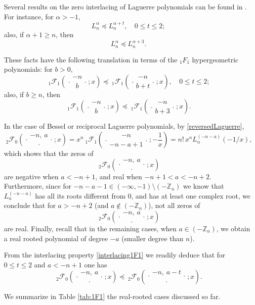 \documentclass[reqno,11pt]{amsart}
\theoremstyle{remark}
\newcommand{\zz}{\mathbb{Z}}
\newcommand*\pFq[5]{%
 {\ }_{#1}{\mathcal F}_{#2}{\left(\genfrac..{0pt}{}{#3}{#4};#5\right)}%
}
\begin{document}
Several results on the zero interlacing of Laguerre polynomials can be found in \cite{arvesu2021interlacing, driver2016interlacing, driver2019sharp}. For instance, for  $\alpha>-1$, 
$$ 
L_n^{\alpha}\preccurlyeq L_n^{\alpha+t}, \quad %
0 \leq t\leq 2;
$$
also, if $\alpha+1\geq n$, then  
$$ 
L_n^{\alpha}\preccurlyeq L_n^{\alpha+3}.
$$

These facts have the following translation in terms of the ${}_1 F_1$ hypergeometric polynomials: for $b >0$,
\begin{equation}
    \label{interlacing1F1}
     \pFq{1}{1}{-n}{b}{x}\preccurlyeq \pFq{1}{1}{-n}{b+t}{x}, \quad 0\leq t\leq 2;
\end{equation}
also, if $b \geq n$, then
\begin{equation}
    \label{interlacing1F1bis}
    \pFq{1}{1}{-n}{b}{x}\preccurlyeq \pFq{1}{1}{-n}{b+3}{x}.
\end{equation}
 
\medskip

In the case of Bessel or reciprocal Laguerre polynomials,  by \eqref{reversedLaguerre}, 
\begin{equation}
    \label{dualityLaguerre2}
 \pFq{2}{0}{-n,\   a}{ \cdot }{x}=
x^n \pFq{ 1}{1}{-n }{ -n -{  a} +1}{ -\frac{1}{x}} = n! \,  x^n   L_n^{(-n-a)}(-1/x),
\end{equation}
which shows that the zeros of
$$
\pFq{2}{0}{-n,\   a}{ \cdot }{x}
$$
are negative when $a< -n+1$, and real when $-n+1<a <-n+2$. Furthermore, since for $-n-a-1\in (-\infty,-1)\setminus(-\zz_{n})$ we know that $L_n^{(-n-a)}$ has all its roots different from 0, and has at least one complex root, we conclude that for $a>-n+2$ (and $a\notin(-\zz_{n})$), not all zeros of 
$$
\pFq{ 2}{0}{-n, \ a}{ \cdot  }{ x}
$$
are real. Finally, recall that in the remaining cases, when $a\in (-\zz_{n})$, we obtain a real rooted polynomial of degree $-a$ (smaller degree than $n$).

From the interlacing property \eqref{interlacing1F1} we readily deduce that   for $0\leq t\leq 2$ and $a< -n+1$ one has
\begin{equation}
    \label{interlacing2F0}
    \pFq{2}{0}{-n,\   a}{ \cdot }{x} \preccurlyeq  \pFq{2}{0}{-n,\ a-t}{ \cdot }{x}.
\end{equation}  

We summarize in Table \ref{tab:1F1} the real-rooted cases discussed so far.
\end{document}
